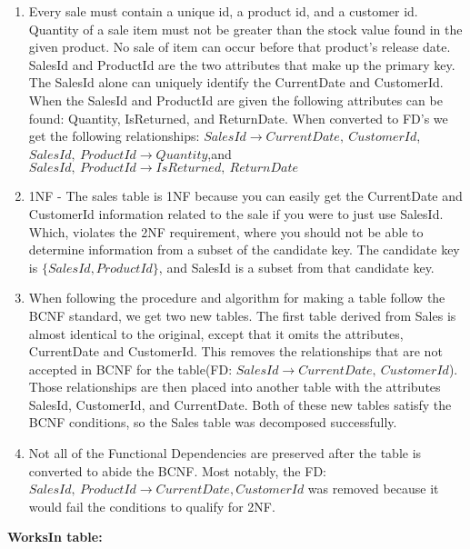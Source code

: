 \documentclass{article}
\begin{document}
  \begin{enumerate}[label=\roman*]
  	\item Every sale must contain a unique id, a product id, and a customer id. Quantity of a sale item must not be greater than the stock value found in the given product. No sale of item can occur before that product's release date. SalesId and
  	ProductId are the two attributes that make up the primary key. The SalesId alone can
  	uniquely identify the CurrentDate and CustomerId. When the SalesId and ProductId are 
  	given the following attributes can be found: Quantity, IsReturned, and ReturnDate.
  	 When converted to FD's we get the following relationships:
    $SalesId\rightarrow CurrentDate,\ CustomerId$, $SalesId,\ ProductId\rightarrow
    Quantity$,\newline and 
    $SalesId,\ ProductId\rightarrow IsReturned,\ ReturnDate$
  	\item 1NF - The sales table is 1NF because you can easily get the CurrentDate and CustomerId information related to the sale if you were to just use SalesId. Which, violates the 2NF requirement, where you should not be able to determine information from a subset of the candidate key. The candidate key is $\{SalesId,ProductId\}$, and SalesId is a subset from that candidate key.
  	\item When following the procedure and algorithm for making a table follow the BCNF
  	standard, we get two new tables. The first table derived from Sales is almost 
  	identical to the original, except that it omits the attributes, CurrentDate and 
  	CustomerId. This removes the relationships that are not accepted in BCNF for the
  	table\newline (FD: $SalesId\rightarrow CurrentDate,\ CustomerId$). Those relationships are
  	then placed into another table with the attributes SalesId, CustomerId, and 
  	CurrentDate. Both of these new tables satisfy the BCNF conditions, so the Sales
  	table was decomposed successfully.
  	\item Not all of the Functional Dependencies are preserved after the table is 
  	converted to abide the BCNF. Most notably, the FD:
  	$SalesId,\ ProductId\rightarrow CurrentDate, CustomerId$ was removed because it would
  	fail the conditions to qualify for 2NF. 
  \end{enumerate}
  \par\textbf{WorksIn table:}
\end{document}
